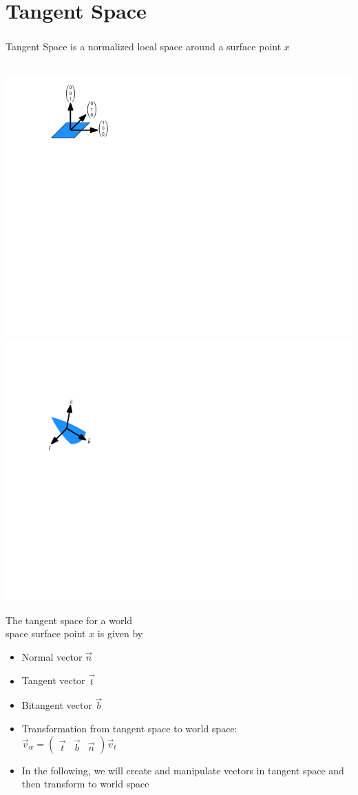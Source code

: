 \documentclass[utf8,stillsansserifmath,fleqn,t]{beamer}
\begin{document}
\section{Tangent Space}

\begin{frame}[label=tangentspace-1]
\frametitle{\insertsection}
Tangent Space is a normalized local space around a surface point $x$\\~\\
\begin{minipage}{0.5\textwidth}
\includegraphics[width=.499\textwidth]{./fig/tangent-space-1.pdf}\hfill
\includegraphics[width=.499\textwidth]{./fig/tangent-space-2.pdf}
\end{minipage}\hfill
\begin{minipage}{0.499\textwidth}
The tangent space for a world\\ space surface point $x$ is given by
    \begin{itemize}
    \item Normal vector $\vec{n}$
    \item Tangent vector $\vec{t}$
    \item Bitangent vector $\vec{b}$
    \end{itemize}
\end{minipage}
\begin{itemize}
\item Transformation from tangent space to world space:\\
    $\vec{v}_w = \begin{pmatrix}\vec{t} & \vec{b} & \vec{n}\end{pmatrix} \vec{v}_t$
\item In the following, we will create and manipulate vectors in tangent space
    and then transform to world space
\end{itemize}
\end{frame}
\end{document}
